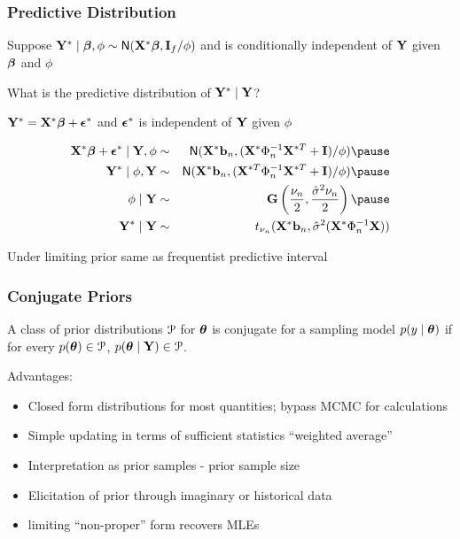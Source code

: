 \documentclass[handout]{beamer}\usepackage[]{graphicx}\usepackage[]{color}
\begin{document}
\begin{frame}
  \frametitle{Predictive Distribution}
Suppose $\mathbf{Y}^* \mid \boldsymbol{\beta}, \phi \sim \textsf{N}(\mathbf{X}^* \boldsymbol{\beta} , \mathbf{I}_f/\phi)$  and is conditionally
independent of $\mathbf{Y}$ given $\boldsymbol{\beta}$ and $\phi$ \pause
\vspace{18pt}

What is the predictive distribution of $\mathbf{Y}^* \mid \mathbf{Y}$? \pause

\vspace{18pt}
$\mathbf{Y}^* = \mathbf{X}^* \boldsymbol{\beta} + \boldsymbol{\epsilon}^*$ and $\boldsymbol{\epsilon}^*$ is independent of $\mathbf{Y}$ given
$\phi$ \pause

\begin{eqnarray*}
\X^* \b + \eps^* \mid \Y, \phi & \sim & \N(\X^*\bv_n, (\X^{*} \Phi_n^{-1} \X^{*T}
+ \I)/\phi)  \pause \\
\Y^* \mid \phi, \Y & \sim & \N(\X^*\bv_n, (\X^{*T} \Phi_n^{-1} \X^{*T}
+ \I)/\phi)  \pause \\
\phi \mid \Y & \sim & \G\left(\frac{\nu_n}{2},
  \frac{\shat \nu_n}{ 2} \right)  \pause \\
\Y^* \mid \Y & \sim & t_{\nu_n}( \X^*\bv_n, \shat (\X^* \Phi_n^{-1} \X))
\end{eqnarray*}

Under limiting prior same as frequentist predictive interval
\end{frame}
\begin{frame}
  \frametitle{Conjugate Priors}
  \begin{definition}
    A class of prior distributions ${\cal{P}}$ for $\boldsymbol{\theta}$ is conjugate for a
    sampling model $p(y \mid \boldsymbol{\theta})$ if for every $p(\boldsymbol{\theta}) \in {\cal{P}}$, $p(\boldsymbol{\theta}
    \mid \mathbf{Y}) \in {\cal{P}}$.
  \end{definition}
\pause
  Advantages: \pause
  \begin{itemize}
  \item Closed form distributions for most quantities; bypass MCMC for
    calculations \pause
  \item Simple updating in terms of sufficient statistics ``weighted
    average'' \pause
  \item Interpretation as prior samples - prior sample size \pause
  \item Elicitation of prior through imaginary or historical data \pause
  \item limiting ``non-proper'' form recovers MLEs \pause
  \end{itemize}

\end{frame}
\end{document}
